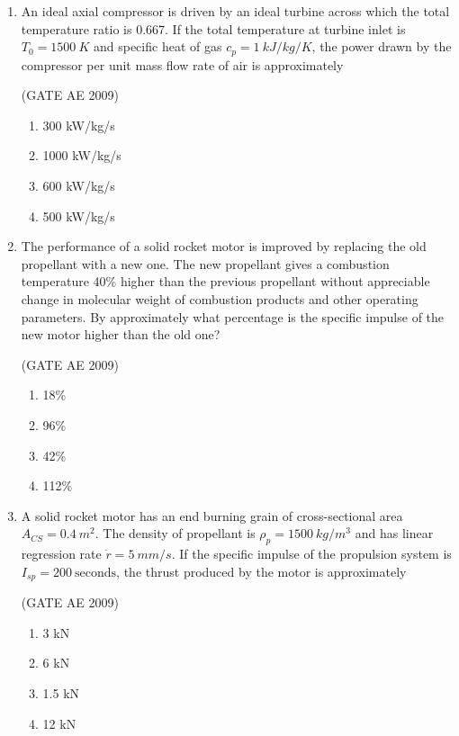 \documentclass[journal,12pt,onecolumn]{IEEEtran}
\theoremstyle{remark}
\begin{document}
\begin{flushleft}
\begin{enumerate}
\item 
An ideal axial compressor is driven by an ideal turbine across which the total temperature ratio is 0.667. If the total temperature at turbine inlet is \(T_0 = 1500~K\) and specific heat of gas \(c_p = 1~kJ/kg/K\), the power drawn by the compressor per unit mass flow rate of air is approximately

\hfill(GATE AE 2009)
\begin{multicols}{2}
\begin{enumerate}
\item 300 kW/kg/s
\item 1000 kW/kg/s
\item 600 kW/kg/s
\item 500 kW/kg/s
\end{enumerate}
\end{multicols}

\item 
The performance of a solid rocket motor is improved by replacing the old propellant with a new one. The new propellant gives a combustion temperature 40\% higher than the previous propellant without appreciable change in molecular weight of combustion products and other operating parameters. By approximately what percentage is the specific impulse of the new motor higher than the old one?

\hfill(GATE AE 2009)
\begin{multicols}{2}
\begin{enumerate}
\item 18\%
\item 96\%
\item 42\%
\item 112\%
\end{enumerate}
\end{multicols}

\item 
A solid rocket motor has an end burning grain of cross-sectional area \(A_{CS} = 0.4~m^2\). The density of propellant is \(\rho_p = 1500~kg/m^3\) and has linear regression rate \(\dot{r} = 5~mm/s\). If the specific impulse of the propulsion system is \(I_{sp} = 200~\text{seconds}\), the thrust produced by the motor is approximately

\hfill(GATE AE 2009)
\begin{multicols}{2}
\begin{enumerate}
\item 3 kN
\item 6 kN
\item 1.5 kN
\item 12 kN
\end{enumerate}
\end{multicols}


\end{enumerate}
\end{flushleft}
\end{document}
